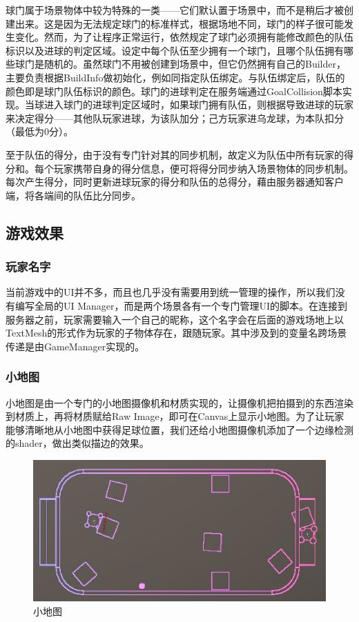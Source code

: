 \documentclass[conference]{IEEEtran}
\begin{document}
球门属于场景物体中较为特殊的一类——它们默认置于场景中，而不是稍后才被创建出来。这是因为无法规定球门的标准样式，根据场地不同，球门的样子很可能发生变化。然而，为了让程序正常运行，依然规定了球门必须拥有能修改颜色的队伍标识以及进球的判定区域。设定中每个队伍至少拥有一个球门，且哪个队伍拥有哪些球门是随机的。虽然球门不用被创建到场景中，但它仍然拥有自己的Builder，主要负责根据BuildInfo做初始化，例如同指定队伍绑定。与队伍绑定后，队伍的颜色即是球门队伍标识的颜色。球门的进球判定在服务端通过GoalCollision脚本实现。当球进入球门的进球判定区域时，如果球门拥有队伍，则根据导致进球的玩家来决定得分——其他队玩家进球，为该队加分；己方玩家进乌龙球，为本队扣分（最低为0分）。

至于队伍的得分，由于没有专门针对其的同步机制，故定义为队伍中所有玩家的得分和。每个玩家携带自身的得分信息，便可将得分同步纳入场景物体的同步机制。每次产生得分，同时更新进球玩家的得分和队伍的总得分，藉由服务器通知客户端，将各端间的队伍比分同步。

\subsection{游戏效果}
\subsubsection{玩家名字}
\quad

当前游戏中的UI并不多，而且也几乎没有需要用到统一管理的操作，所以我们没有编写全局的UI Manager，而是两个场景各有一个专门管理UI的脚本。在连接到服务器之前，玩家需要输入一个自己的昵称，这个名字会在后面的游戏场地上以TextMesh的形式作为玩家的子物体存在，跟随玩家。其中涉及到的变量名跨场景传递是由GameManager实现的。

\subsubsection{小地图}
\quad

小地图是由一个专门的小地图摄像机和材质实现的，让摄像机把拍摄到的东西渲染到材质上，再将材质赋给Raw Image，即可在Canvas上显示小地图。为了让玩家能够清晰地从小地图中获得足球位置，我们还给小地图摄像机添加了一个边缘检测的shader，做出类似描边的效果。

\begin{figure}[htbp]
  \centerline{\includegraphics[width=.38\textwidth]{images/mini-map.png}}
  \caption{小地图}
  \label{fig:minimap}
\end{figure}
\end{document}
